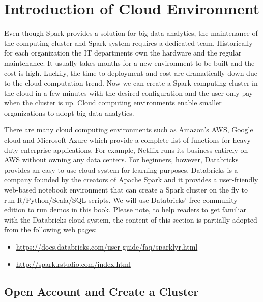 \documentclass[12pt,]{krantz}
\providecommand{\tightlist}{%
  \setlength{\itemsep}{0pt}\setlength{\parskip}{0pt}}
\begin{document}
\hypertarget{CloudEnvironment}{%
\section{Introduction of Cloud Environment}\label{CloudEnvironment}}

Even though Spark provides a solution for big data analytics, the maintenance of the computing cluster and Spark system requires a dedicated team. Historically for each organization the IT departments own the hardware and the regular maintenance. It usually takes months for a new environment to be built and the cost is high. Luckily, the time to deployment and cost are dramatically down due to the cloud computation trend. Now we can create a Spark computing cluster in the cloud in a few minutes with the desired configuration and the user only pay when the cluster is up. Cloud computing environments enable smaller organizations to adopt big data analytics.

There are many cloud computing environments such as Amazon's AWS, Google cloud and Microsoft Azure which provide a complete list of functions for heavy-duty enterprise applications. For example, Netflix runs its business entirely on AWS without owning any data centers. For beginners, however, Databricks provides an easy to use cloud system for learning purposes. Databricks is a company founded by the creators of Apache Spark and it provides a user-friendly web-based notebook environment that can create a Spark cluster on the fly to run R/Python/Scala/SQL scripts. We will use Databricks' free community edition to run demos in this book. Please note, to help readers to get familiar with the Databricks cloud system, the content of this section is partially adopted from the following web pages:

\begin{itemize}
\tightlist
\item
  \url{https://docs.databricks.com/user-guide/faq/sparklyr.html}
\item
  \url{http://spark.rstudio.com/index.html}
\end{itemize}

\hypertarget{open-account-and-create-a-cluster}{%
\subsection{Open Account and Create a Cluster}\label{open-account-and-create-a-cluster}}
\end{document}
